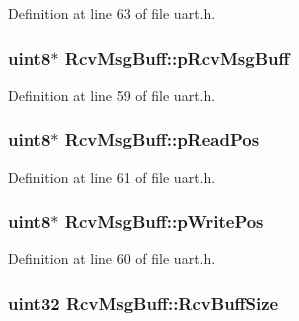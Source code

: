 Definition at line 63 of file uart.\-h.

\hypertarget{structRcvMsgBuff_a62921396b7988d167cdbfadaeaafa1ad}{
\subsubsection[{p\-Rcv\-Msg\-Buff}]{\setlength{\rightskip}{0pt plus 5cm}uint8$\ast$ Rcv\-Msg\-Buff\-::p\-Rcv\-Msg\-Buff}}\label{structRcvMsgBuff_a62921396b7988d167cdbfadaeaafa1ad}


Definition at line 59 of file uart.\-h.

\hypertarget{structRcvMsgBuff_aee50309a2497fffef33577ab901fe2cc}{
\subsubsection[{p\-Read\-Pos}]{\setlength{\rightskip}{0pt plus 5cm}uint8$\ast$ Rcv\-Msg\-Buff\-::p\-Read\-Pos}}\label{structRcvMsgBuff_aee50309a2497fffef33577ab901fe2cc}


Definition at line 61 of file uart.\-h.

\hypertarget{structRcvMsgBuff_adcdca9d20078d517946d66d355579693}{
\subsubsection[{p\-Write\-Pos}]{\setlength{\rightskip}{0pt plus 5cm}uint8$\ast$ Rcv\-Msg\-Buff\-::p\-Write\-Pos}}\label{structRcvMsgBuff_adcdca9d20078d517946d66d355579693}


Definition at line 60 of file uart.\-h.

\hypertarget{structRcvMsgBuff_a100e2cdf15349ae18fca2fbb67d5845b}{
\subsubsection[{Rcv\-Buff\-Size}]{\setlength{\rightskip}{0pt plus 5cm}uint32 Rcv\-Msg\-Buff\-::\-Rcv\-Buff\-Size}}\label{structRcvMsgBuff_a100e2cdf15349ae18fca2fbb67d5845b}


